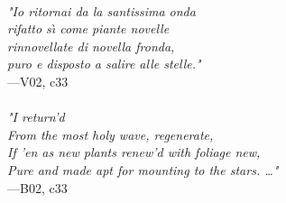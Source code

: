 \documentclass[../Dore_vision.tex]{subfiles}
\begin{document}
\begin{center}
\begin{minipage}{0.8\linewidth}
\textit{\\
"Io ritornai da la santissima onda\\rifatto s\`{\i} come piante novelle\\rinnovellate di novella fronda,\\puro e disposto a salire alle stelle."} \\
—V02, c33 \\~\\
\textit{"I return'd\\From the most holy wave, regenerate,\\If 'en as new plants renew'd with foliage new,\\Pure and made apt for mounting to the stars. …"} \\
—B02, c33
\end{minipage}
\end{center}
\end{document}
